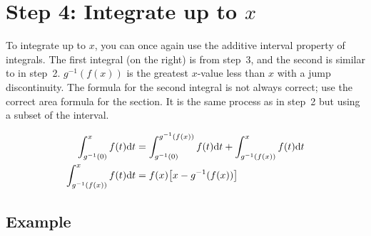 \documentclass[12pt]{article}
\begin{document}
{}
\section*{Step 4: Integrate up to $x$}

	\indent\indent To integrate up to $x$, you can once again use the additive interval property
	of integrals. The first integral (on the right) is from step~3, and the second is similar to
	in step~2. $g^{-1}(f(x))$ is the greatest $x$-value less than $x$ with a jump discontinuity.
	The formula for the second integral is not always correct; use the correct area formula for
	the section. It is the same process as in step~2 but using a subset of the interval.

	\begin{align*}
		\int_{g^{-1}(0)}^xf(t)\text dt & = \int_{g^{-1}(0)}^{g^{-1}(f(x))}f(t)\text dt+\int_{g^{-1}
											(f(x))}^xf(t)\text dt\\
		\int_{g^{-1}(f(x))}^xf(t)\text dt & = f(x)\!\left[x-g^{-1}(f(x))\right]
	\end{align*}

	\subsection*{Example}
\end{document}
